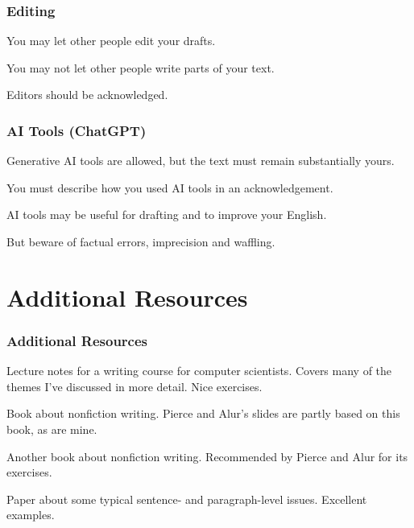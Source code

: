 \begin{frame}
  \frametitle{Editing}

  You may let other people edit your drafts.

  \medskip
  \pause

  You may not let other people write parts of your text.

  \medskip
  \pause

  Editors should be acknowledged.
\end{frame}

\begin{frame}
  \frametitle{AI Tools (ChatGPT)}

  Generative AI tools are allowed, but the text must remain substantially yours.

  \medskip
  \pause

  You must describe how you used AI tools in an acknowledgement.

  \medskip
  \pause

  AI tools may be useful for drafting and to improve your English.

  But beware of factual errors, imprecision and waffling.
\end{frame}

\section{Additional Resources}

\begin{frame}
  \frametitle{Additional Resources}

  \small


  Lecture notes for a writing course for computer scientists.
  Covers many of the themes I've discussed in more detail.
  Nice exercises.

  \medskip


  Book about nonfiction writing.
  Pierce and Alur's slides are partly based on this book, as are mine.

  \medskip


  Another book about nonfiction writing.
  Recommended by Pierce and Alur for its exercises.

  \medskip


  Paper about some typical sentence- and paragraph-level issues.
  Excellent examples.
\end{frame}

